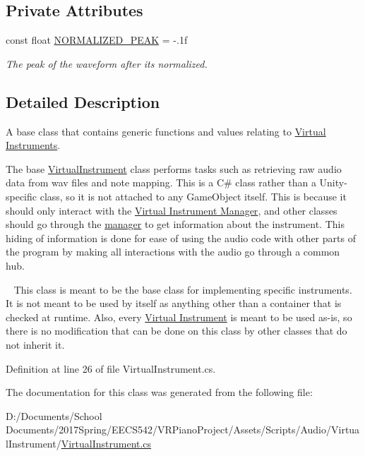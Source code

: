 \subsection*{Private Attributes}
\begin{DoxyCompactItemize}
\item 
const float \hyperlink{group___v_i_base_const_gaf060c000443f92784bd8db8d866d8b2a}{N\+O\+R\+M\+A\+L\+I\+Z\+E\+D\+\_\+\+P\+E\+AK} = -\/.\+1f
\begin{DoxyCompactList}\small\item\em The peak of the waveform after it\textquotesingle{}s normalized. \end{DoxyCompactList}\end{DoxyCompactItemize}


\subsection{Detailed Description}
A base class that contains generic functions and values relating to \hyperlink{group___v_i}{Virtual Instruments}. 

The base \hyperlink{class_virtual_instrument}{Virtual\+Instrument} class performs tasks such as retrieving raw audio data from wav files and note mapping. This is a C\# class rather than a Unity-\/specific class, so it is not attached to any Game\+Object itself. This is because it should only interact with the \hyperlink{group___v_i_m}{Virtual Instrument Manager}, and other classes should go through the \hyperlink{group___v_i_m}{manager} to get information about the instrument. This hiding of information is done for ease of using the audio code with other parts of the program by making all interactions with the audio go through a common hub.

~\newline
 This class is meant to be the base class for implementing specific instruments. It is not meant to be used by itself as anything other than a container that is checked at runtime. Also, every \hyperlink{group___v_i}{Virtual Instrument} is meant to be used as-\/is, so there is no modification that can be done on this class by other classes that do not inherit it. 

Definition at line 26 of file Virtual\+Instrument.\+cs.



The documentation for this class was generated from the following file\+:\begin{DoxyCompactItemize}
\item 
D\+:/\+Documents/\+School Documents/2017\+Spring/\+E\+E\+C\+S542/\+V\+R\+Piano\+Project/\+Assets/\+Scripts/\+Audio/\+Virtual\+Instrument/\hyperlink{_virtual_instrument_8cs}{Virtual\+Instrument.\+cs}\end{DoxyCompactItemize}
